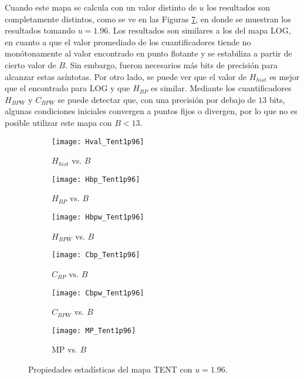 Cuando este mapa se calcula con un valor distinto de $u$ los resultados son completamente distintos, como se ve en las Figuras \ref{fig:TENT1p96_QuantiB}, en donde se muestran los resultados tomando $u=1.96$.
Los resultados son similares a los del mapa LOG, en cuanto a que el valor promediado de los cuantificadores tiende no monótonamente al valor encontrado en punto flotante y se estabiliza a partir de cierto valor de $B$.
Sin embargo, fueron necesarios más bits de precisión para alcanzar estas asíntotas.
Por otro lado, se puede ver que el valor de $H_{hist}$ es mejor que el encontrado para LOG y que $H_{BP}$ es similar.
Mediante los cuantificadores $H_{BPW}$ y $C_{BPW}$ se puede detectar que, con una precisión por debajo de $13$ bits, algunas condiciones iniciales convergen a puntos fijos o divergen, por lo que no es posible utilizar este mapa con $B < 13$.
%
\begin{figure}[htpb]
	\centering
	\begin{subfigure}[b]{0.49\textwidth}
		\texttt{[image: Hval\_Tent1p96]}
		\caption{$H_{hist}$ vs. $B$}
		\label{fig:Hval_Tent1p96}
	\end{subfigure}
	\begin{subfigure}[b]{0.49\textwidth}
		\texttt{[image: Hbp\_Tent1p96]}
		\caption{$H_{BP}$ vs. $B$}
		\label{fig:Hbp_Tent1p96}
	\end{subfigure}
	\begin{subfigure}[b]{0.49\textwidth}
		\texttt{[image: Hbpw\_Tent1p96]}
		\caption{$H_{BPW}$ vs. $B$}
		\label{fig:Hbpw_Tent1p96}
	\end{subfigure}
	\begin{subfigure}[b]{0.49\textwidth}
		\texttt{[image: Cbp\_Tent1p96]}
		\caption{$C_{BP}$ vs. $B$}
		\label{fig:Cbp_Tent1p96}
	\end{subfigure}
	\begin{subfigure}[b]{0.49\textwidth}
		\texttt{[image: Cbpw\_Tent1p96]}
		\caption{$C_{BPW}$ vs. $B$}
		\label{fig:Cbpw_Tent1p96}
	\end{subfigure}
	\begin{subfigure}[b]{0.49\textwidth}
		\texttt{[image: MP\_Tent1p96]}
		\caption{MP vs. $B$}
		\label{fig:MP_Tent1p96}
	\end{subfigure}
	\caption{Propiedades estadísticas del mapa TENT con $u=1.96$.}
	\label{fig:TENT1p96_QuantiB}
\end{figure}

